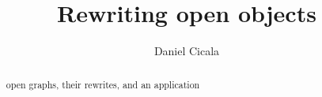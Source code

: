 \documentclass{amsart}
\begin{document}
\begin{abstract} %
	open graphs, 
	their rewrites, 
	and an application
\end{abstract}	

\title{Rewriting open objects}
\author{Daniel Cicala}
\maketitle

%


\end{document}
